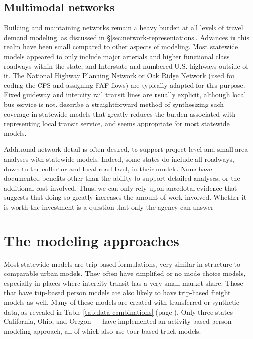 \subsection{Multimodal networks}

Building and maintaining networks remain a heavy burden at all levels of travel demand modeling, as discussed in \S\ref{sec:network-representations}. Advances in this realm have been small compared to other aspects of modeling. Most statewide models appeared to only include major arterials and higher functional class roadways within the state, and Interstate and numbered U.S. highways outside of it. The National Highway Planning Network or Oak Ridge Network (used for coding the CFS and assigning FAF flows) are typically adapted for this purpose. Fixed guideway and intercity rail transit lines are usually explicit, although local bus service is not. \cite{circella14} describe a straightforward method of synthesizing such coverage in statewide models that greatly reduces the burden associated with representing local transit service, and seems appropriate for most statewide models.

Additional network detail is often desired, to support project-level and small area analyses with statewide models. Indeed, some states do include all roadways, down to the collector and local road level, in their models. None have documented benefits other than the ability to support detailed analyses, or the additional cost involved. Thus, we can only rely upon anecdotal evidence that suggests that doing so greatly increases the amount of work involved. Whether it is worth the investment is a question that only the agency can answer.

\section{The modeling approaches}

Most statewide models are trip-based formulations, very similar in structure to comparable urban models. They often have simplified or no mode choice models, especially in places where intercity transit has a very small market share. Those that have trip-based person models are also likely to have trip-based freight models as well. Many of these models are created with transferred or synthetic data, as revealed in Table \ref{tab:data-combinations} (page \pageref{tab:data-combinations}). Only three states --- California, Ohio, and Oregon --- have implemented an activity-based person modeling approach, all of which also use tour-based truck models.

